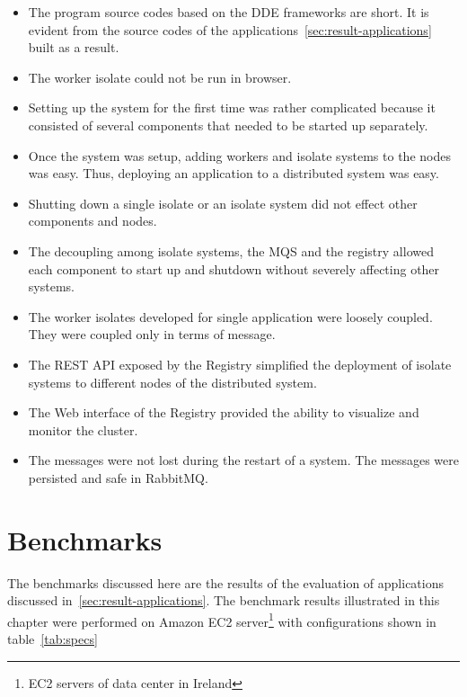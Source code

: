 \begin{itemize}
  \item The program source codes based on the DDE frameworks are short. It is evident from the source codes of the applications~\autoref{sec:result-applications} built as a result.

  \item The worker isolate could not be run in browser.

  \item Setting up the system for the first time was rather complicated because it consisted of several components that needed to be started up separately.

  \item Once the system was setup, adding workers and isolate systems to the nodes was easy. Thus, deploying an application to a distributed system was easy.

  \item Shutting down a single isolate or an isolate system did not effect other components and nodes.

  \item The decoupling among isolate systems, the MQS and the registry allowed each component to start up and shutdown without severely affecting other systems.

  \item The worker isolates developed for single application were loosely coupled. They were coupled only in terms of message.

  \item The REST API exposed by the Registry simplified the deployment of isolate systems to different nodes of the distributed system.

  \item The Web interface of the Registry provided the ability to visualize and monitor the cluster.

  \item The messages were not lost during the restart of a system. The messages were persisted and safe in RabbitMQ.
\end{itemize}

\section{Benchmarks}
\label{sec:benchmarks}
  The benchmarks discussed here are the results of the evaluation of applications discussed in~\autoref{sec:result-applications}. The benchmark results illustrated in this chapter were performed on Amazon EC2 server\footnote{EC2 servers of data center in Ireland} with configurations shown in table~\autoref{tab:specs}

